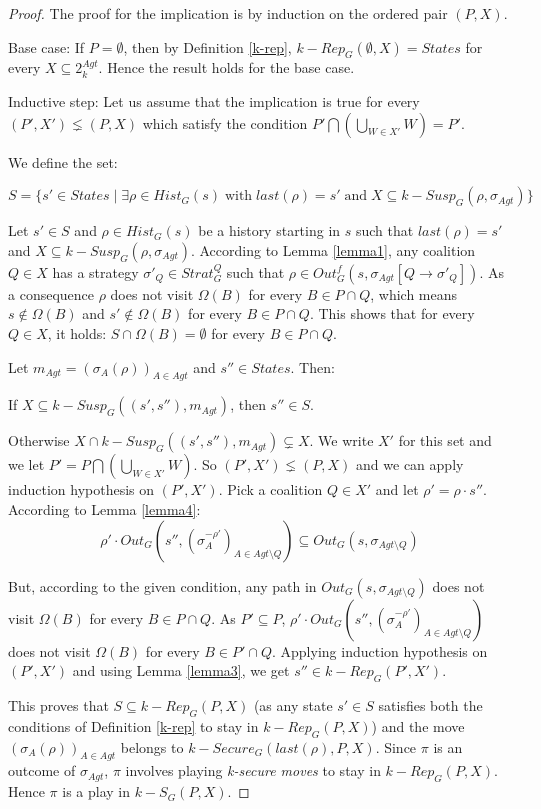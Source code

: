 \begin{proof}
The proof for the implication is by induction on the ordered pair $(P, X)$.

Base case: If $P = \emptyset$, then by Definition \ref{k-rep}, $k-Rep_{G}(\emptyset, X) = States$ for every $X \subseteq 2^{Agt}_{k}$. Hence the result holds for the base case.

Inductive step: Let us assume that the implication is true for every $(P', X') \lneq (P, X)$ which satisfy the condition $P' \bigcap \left( \bigcup \limits_{W \in X'}W \right) = P'$.

We define the set:

$S = \lbrace s' \in States \; \vert \; \exists \rho \in Hist_{G}(s) \; \text{with} \; last(\rho) = s' \; \text{and} \; X \subseteq k-Susp_{G}(\rho, \sigma_{Agt}) \rbrace$

Let $s' \in S$ and $\rho \in Hist_{G}(s)$ be a history starting in $s$ such that $last(\rho) = s'$ and $X \subseteq k-Susp_{G}(\rho, \sigma_{Agt})$. According to Lemma \ref{lemma1}, any coalition $Q \in X$ has a strategy $\sigma'_{Q} \in Strat^{Q}_{G}$ such that $\rho \in Out^{f}_{G}(s, \sigma_{Agt}[Q \rightarrow \sigma'_{Q}])$. As a consequence $\rho$ does not visit $\Omega(B)$ for every $B \in P \cap Q$, which means $s \notin \Omega(B)$ and $s' \notin \Omega(B)$ for every $B \in P \cap Q$. This shows that for every $Q \in X$, it holds: $S \cap \Omega(B) = \emptyset$ for every $B \in P \cap Q$.

Let $m_{Agt} = (\sigma_{A}(\rho))_{A\in Agt}$ and $s'' \in States$. Then:

If $X \subseteq k-Susp_{G}((s', s''), m_{Agt})$, then $s'' \in S$.

Otherwise $X \cap k-Susp_{G}((s', s''), m_{Agt}) \subsetneq X$. We write $X'$ for this set and we let $P' = P \bigcap \left( \bigcup \limits_{W \in X'}W \right)$. So $(P', X') \lneq (P, X)$ and we can apply  induction hypothesis on $(P', X')$. Pick a coalition $Q \in X'$ and let $\rho' = \rho \cdot s''$. According to Lemma \ref{lemma4}:
\[\rho' \cdot Out_{G}(s'', (\sigma_{A}^{-\rho'})_{A\in Agt\setminus Q}) \subseteq Out_{G}(s, \sigma_{Agt\setminus Q})\]

But, according to the given condition, any path in $Out_{G}(s, \sigma_{Agt\setminus Q})$ does not visit $\Omega(B)$ for every $B \in P \cap Q$. As $P' \subseteq P$, $\rho' \cdot Out_{G}(s'', (\sigma_{A}^{-\rho'})_{A\in Agt\setminus Q})$ does not visit $\Omega(B)$ for every $B \in P' \cap Q$. Applying induction hypothesis on $(P', X')$ and using Lemma \ref{lemma3}, we get $s'' \in k-Rep_{G}(P', X')$.

This proves that $S \subseteq k-Rep_{G}(P, X)$ (as any state $s' \in S$ satisfies both the conditions of Definition \ref{k-rep} to stay in $k-Rep_{G}(P, X)$) and the move $(\sigma_{A}(\rho))_{A\in Agt}$ belongs to $k-Secure_{G}(last(\rho), P, X)$. Since $\pi$ is an outcome of $\sigma_{Agt}$, $\pi$ involves playing \textit{k-secure moves} to stay in $k-Rep_{G}(P, X)$. Hence $\pi$ is a play in $k-S_{G}(P, X)$.
\end{proof}

